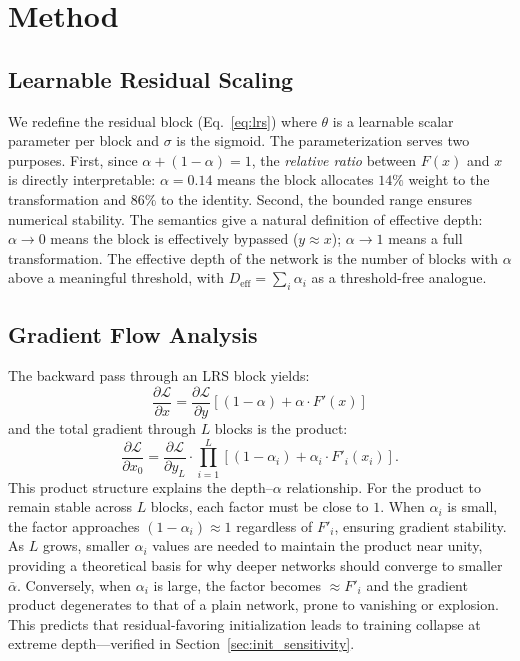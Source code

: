 \documentclass{bmvc2k}
\begin{document}
\section{Method}
\label{sec:method}

\subsection{Learnable Residual Scaling}

We redefine the residual block (Eq.~\ref{eq:lrs}) where $\theta$ is a learnable scalar parameter per block and $\sigma$ is the sigmoid. The parameterization serves two purposes. First, since $\alpha + (1-\alpha) = 1$, the \emph{relative ratio} between $F(x)$ and $x$ is directly interpretable: $\alpha = 0.14$ means the block allocates $14\%$ weight to the transformation and $86\%$ to the identity. Second, the bounded range ensures numerical stability. The semantics give a natural definition of effective depth: $\alpha \to 0$ means the block is effectively bypassed ($y \approx x$); $\alpha \to 1$ means a full transformation. The effective depth of the network is the number of blocks with $\alpha$ above a meaningful threshold, with $D_\text{eff} = \sum_i \alpha_i$ as a threshold-free analogue.

\subsection{Gradient Flow Analysis}

The backward pass through an LRS block yields:
\begin{equation}
    \frac{\partial \mathcal{L}}{\partial x} = \frac{\partial \mathcal{L}}{\partial y} \left[ (1 - \alpha) + \alpha \cdot F'(x) \right]
    \label{eq:grad}
\end{equation}
and the total gradient through $L$ blocks is the product:
\begin{equation}
    \frac{\partial \mathcal{L}}{\partial x_0} = \frac{\partial \mathcal{L}}{\partial y_L} \cdot \prod_{i=1}^{L} \left[ (1 - \alpha_i) + \alpha_i \cdot F'_i(x_i) \right].
    \label{eq:total_grad}
\end{equation}
This product structure explains the depth--$\alpha$ relationship. For the product to remain stable across $L$ blocks, each factor must be close to $1$. When $\alpha_i$ is small, the factor approaches $(1{-}\alpha_i) \approx 1$ regardless of $F'_i$, ensuring gradient stability. As $L$ grows, smaller $\alpha_i$ values are needed to maintain the product near unity, providing a theoretical basis for why deeper networks should converge to smaller $\bar{\alpha}$. Conversely, when $\alpha_i$ is large, the factor becomes $\approx F'_i$ and the gradient product degenerates to that of a plain network, prone to vanishing or explosion. This predicts that residual-favoring initialization leads to training collapse at extreme depth---verified in Section~\ref{sec:init_sensitivity}.
\end{document}

